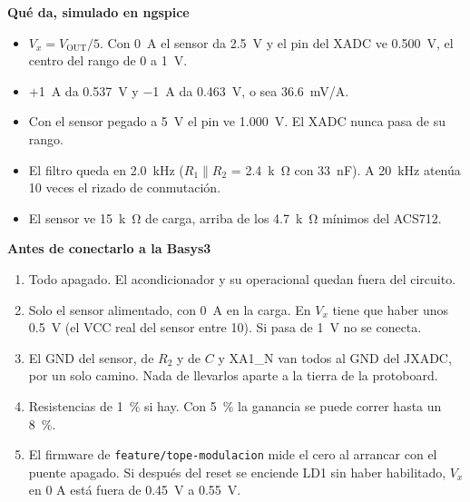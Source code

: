 \documentclass[11pt]{article}
\begin{document}
\vspace{2mm}
\noindent
\begin{minipage}[t]{0.48\textwidth}
\textbf{Qué da, simulado en ngspice}
\begin{itemize}
  \item $V_x = V_\text{OUT}/5$. Con \SI{0}{A} el sensor da \SI{2,5}{V} y el pin del XADC ve \SI{0,500}{V}, el centro del rango de 0 a \SI{1}{V}.
  \item $+$\SI{1}{A} da \SI{0,537}{V} y $-$\SI{1}{A} da \SI{0,463}{V}, o sea \SI{36,6}{mV/A}.
  \item Con el sensor pegado a \SI{5}{V} el pin ve \SI{1,000}{V}. El XADC nunca pasa de su rango.
  \item El filtro queda en \SI{2,0}{kHz} ($R_1 \parallel R_2$ = \SI{2,4}{k\ohm} con \SI{33}{nF}). A \SI{20}{kHz} atenúa 10 veces el rizado de conmutación.
  \item El sensor ve \SI{15}{k\ohm} de carga, arriba de los \SI{4,7}{k\ohm} mínimos del ACS712.
\end{itemize}
\end{minipage}
\hfill
\begin{minipage}[t]{0.48\textwidth}
\textbf{Antes de conectarlo a la Basys3}
\begin{enumerate}
  \item Todo apagado. El acondicionador y su operacional quedan fuera del circuito.
  \item Solo el sensor alimentado, con \SI{0}{A} en la carga. En $V_x$ tiene que haber unos \SI{0,5}{V} (el VCC real del sensor entre 10). Si pasa de \SI{1}{V} no se conecta.
  \item El GND del sensor, de $R_2$ y de $C$ y XA1\_N van todos al GND del JXADC, por un solo camino. Nada de llevarlos aparte a la tierra de la protoboard.
  \item Resistencias de 1~\% si hay. Con 5~\% la ganancia se puede correr hasta un 8~\%.
  \item El firmware de \texttt{feature/tope-modulacion} mide el cero al arrancar con el puente apagado. Si después del reset se enciende LD1 sin haber habilitado, $V_x$ en 0 A está fuera de \SI{0,45}{V} a \SI{0,55}{V}.
\end{enumerate}
\end{minipage}
\end{document}
